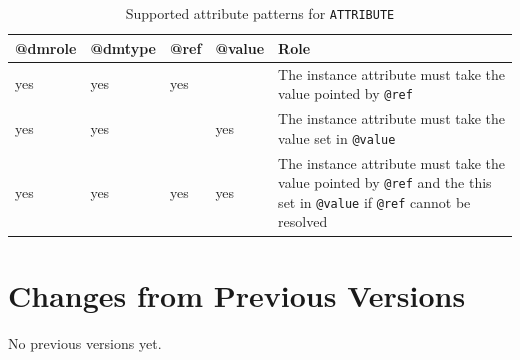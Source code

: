 \documentclass[11pt,a4paper]{ivoa}
\begin{document}
\begin{table}[ht!]
  \begin{tabular}{|p{1.5cm}|p{1.5cm}|p{1.5cm}|p{1.5cm}|p{5cm}|}
    \hline @dmrole  &  @dmtype &  @ref &  @value &  Role\\
    \hline  yes & yes &  yes & & The instance attribute must take the value pointed by \texttt{@ref} \\
    \hline  yes & yes &  & yes & The instance attribute must take the value set in  \texttt{@value} \\
    \hline  yes & yes &  yes & yes 
              & The instance attribute must take the value pointed by \texttt{@ref} 
                  \newline and the this set in  \texttt{@value} if \texttt{@ref} cannot be resolved\\
    \hline 
  \end{tabular}
  \caption{Supported attribute patterns for  \texttt{ATTRIBUTE}} 
 \end{table}

\appendix
\section{Changes from Previous Versions}

No previous versions yet.  



\end{document}
